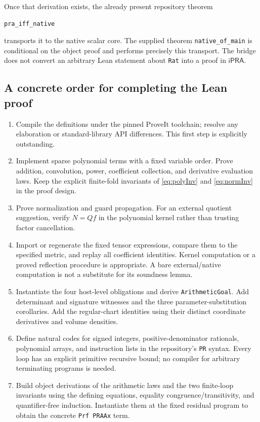 \documentclass[11pt,a4paper]{article}
\numberwithin{equation}{section}
\theoremstyle{definition}\newtheorem{definition}[theorem]{Definition}
\theoremstyle{remark}\newtheorem{remark}[theorem]{Remark}
\newcommand{\ipra}{\mathsf{iPRA}}
\begin{document}
Once that derivation exists, the already present repository theorem
\begin{lstlisting}
pra_iff_native
\end{lstlisting}
transports it to the native scalar core. The supplied theorem \texttt{native\_of\_main} is conditional on the object proof and performs precisely this transport. The bridge does not convert an arbitrary Lean statement about \texttt{Rat} into a proof in $\ipra$.

\subsection{A concrete order for completing the Lean proof}
\begin{enumerate}
 \item Compile the definitions under the pinned ProveIt toolchain; resolve any elaboration or standard-library API differences. This first step is explicitly outstanding.
 \item Implement sparse polynomial terms with a fixed variable order. Prove addition, convolution, power, coefficient collection, and derivative evaluation laws. Keep the explicit finite-fold invariants of \eqref{eq:polyInv} and \eqref{eq:normInv} in the proof design.
 \item Prove normalization and guard propagation. For an external quotient suggestion, verify $N=Qf$ in the polynomial kernel rather than trusting factor cancellation.
 \item Import or regenerate the fixed tensor expressions, compare them to the specified metric, and replay all coefficient identities. Kernel computation or a proved reflection procedure is appropriate. A bare external/native computation is not a substitute for its soundness lemma.
 \item Instantiate the four host-level obligations and derive \texttt{ArithmeticGoal}. Add determinant and signature witnesses and the three parameter-substitution corollaries. Add the regular-chart identities using their distinct coordinate derivatives and volume densities.
 \item Define natural codes for signed integers, positive-denominator rationals, polynomial arrays, and instruction lists in the repository's \texttt{PR} syntax. Every loop has an explicit primitive recursive bound; no compiler for arbitrary terminating programs is needed.
 \item Build object derivations of the arithmetic laws and the two finite-loop invariants using the defining equations, equality congruence/transitivity, and quantifier-free induction. Instantiate them at the fixed residual program to obtain the concrete \texttt{Prf PRAAx} term.

\end{enumerate}
\end{document}
